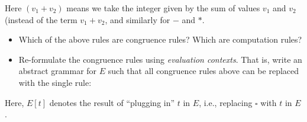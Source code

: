 \begin{minipage}{\textwidth}
  \begin{minipage}{0.45\textwidth}
    \begin{prooftree}
    \end{prooftree}
  \end{minipage}
  \hfill
  \begin{minipage}{0.45\textwidth}
    \begin{prooftree}
    \end{prooftree}
  \end{minipage}
  \hfill
\end{minipage}

\begin{minipage}{\textwidth}
  \begin{prooftree}
  \end{prooftree}
\end{minipage}
\vspace{1em}

Here $(v_1 + v_2)$ means we take the integer given by the sum of values $v_1$ and $v_2$ (instead of the term $v_1+v_2$, and similarly for $-$ and $*$.
\begin{itemize}
  \item Which of the above rules are congruence rules? Which are computation rules?
  \item Re-formulate the congruence rules using \emph{evaluation contexts}.
    That is, write an abstract grammar for $E$ such that all congruence rules above can be replaced with the single rule:
\end{itemize}

\begin{minipage}{\textwidth}
  \begin{prooftree}
  \end{prooftree}
  \hfill
  \vspace{1em}
\end{minipage}

Here, $E[t]$ denotes the result of ``plugging in'' $t$ in $E$, i.e., replacing $\square$ with $t$ in $E$.

